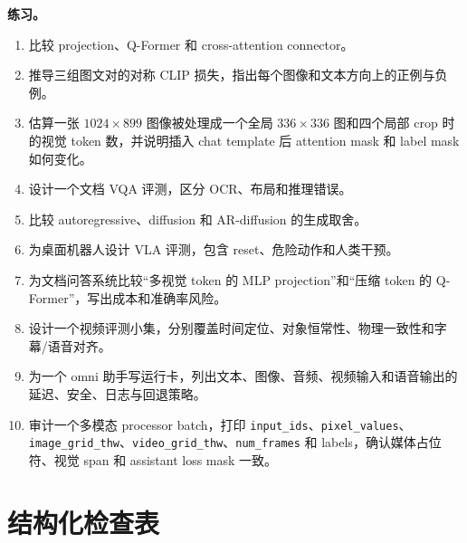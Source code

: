 \documentclass[UTF8,zihao=-4,openany]{ctexbook}
\begin{document}
\textbf{练习。}
\begin{enumerate}
\item 比较 projection、Q-Former 和 cross-attention connector。
\item 推导三组图文对的对称 CLIP 损失，指出每个图像和文本方向上的正例与负例。
\item 估算一张 $1024\times899$ 图像被处理成一个全局 $336\times336$ 图和四个局部 crop 时的视觉 token 数，并说明插入 chat template 后 attention mask 和 label mask 如何变化。
\item 设计一个文档 VQA 评测，区分 OCR、布局和推理错误。
\item 比较 autoregressive、diffusion 和 AR-diffusion 的生成取舍。
\item 为桌面机器人设计 VLA 评测，包含 reset、危险动作和人类干预。
\item 为文档问答系统比较“多视觉 token 的 MLP projection”和“压缩 token 的 Q-Former”，写出成本和准确率风险。
\item 设计一个视频评测小集，分别覆盖时间定位、对象恒常性、物理一致性和字幕/语音对齐。
\item 为一个 omni 助手写运行卡，列出文本、图像、音频、视频输入和语音输出的延迟、安全、日志与回退策略。
\item 审计一个多模态 processor batch，打印 \texttt{input\_ids}、\texttt{pixel\_values}、\texttt{image\_grid\_thw}、\texttt{video\_grid\_thw}、\texttt{num\_frames} 和 labels，确认媒体占位符、视觉 span 和 assistant loss mask 一致。
\end{enumerate}

\section{结构化检查表}
\end{document}
